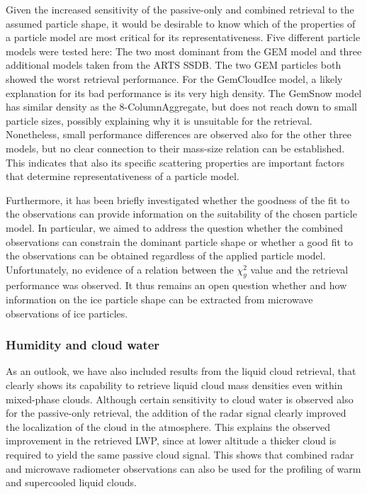 \documentclass[journal abbreviation, manuscript]{copernicus}
\begin{document}
Given the increased sensitivity of the passive-only and combined retrieval to
the assumed particle shape, it would be desirable to know which of the
properties of a particle model are most critical for its representativeness. Five
different particle models were tested here: The two most dominant from
the GEM model and three additional models taken from the ARTS SSDB. The two GEM
particles both showed the worst retrieval performance. For the GemCloudIce model, a
likely explanation for its bad performance is its very high density. The GemSnow model
has similar density as the 8-ColumnAggregate, but does not reach down to small
particle sizes, possibly explaining why it is unsuitable for the retrieval.
Nonetheless, small performance differences are observed also for the other three
models, but no clear connection to their mass-size relation can be established.
This indicates that also its specific scattering properties are important factors
that determine representativeness of a particle model.

Furthermore, it has been briefly investigated whether the goodness of the fit to
the observations can provide information on the suitability of the chosen
particle model. In particular, we aimed to address the question whether the
combined observations can constrain the dominant particle shape or whether a
good fit to the observations can be obtained regardless of the applied particle
model. Unfortunately, no evidence of a relation between the $\chi^2_y$ value and
the retrieval performance was observed. It thus remains an open question whether
and how information on the ice particle shape can be extracted from microwave
observations of ice particles.

\subsubsection{Humidity and cloud water}

As an outlook, we have also included results from the liquid cloud retrieval,
that clearly shows its capability to retrieve liquid cloud mass densities even
within mixed-phase clouds. Although certain sensitivity to cloud water is
observed also for the passive-only retrieval, the addition of the radar signal
clearly improved the localization of the cloud in the atmosphere. This explains
the observed improvement in the retrieved LWP, since at lower altitude a thicker
cloud is required to yield the same passive cloud signal. This shows that
combined radar and microwave radiometer observations can also be used for the
profiling of warm and supercooled liquid clouds.
\end{document}
